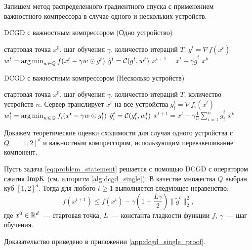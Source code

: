     Запишем метод распределенного градиентного спуска с применением важностного компрессора в случае одного и нескольких устройств.
    \begin{algorithm}[h]
        \caption{DCGD с важностным компрессором (Одно устройство)}
        \label{alg:dcgd_single}
        \begin{algorithmic}
             стартовая точка $x^0$, шаг обучения $\gamma$, количество итераций $T$.
                \STATE $g^t = \nabla f(x^t)$
                \STATE $w^t = \operatorname*{arg\,min}_{w \in Q} f(x^t - \gamma w \odot g^t)$
                \STATE $\tilde{g}^t = {\cal C}(g^t, w^t)$
                \STATE $x^{t+1} = x^t - \gamma \tilde{g}^t$
            \ENDFOR
             $x^k$
        \end{algorithmic}
    \end{algorithm}

    \begin{algorithm}[h]
        \caption{DCGD с важностным компрессором (Несколько устройств)}
        \label{alg:dcgd_multi}
        \begin{algorithmic}[1]
             стартовая точка $x^0$, шаг обучения $\gamma$, количество итераций $T$, количество устройств $n$.
                \STATE Сервер транслирует $x^t$ на все устройства
                    \STATE $g_i^t = \nabla f_i(x^t)$
                    \STATE $w_i^t = \operatorname*{arg\,min}_{w \in Q} f_i(x^t - \gamma w \odot g_i^t)$
                    \STATE $\tilde{g}_i^t = {\cal C}(g_i^t, w_i^t)$
                \ENDFOR
                \STATE $x^{t+1} = x^t - \gamma \frac{1}{n} \sum\limits_{i=1}^n \tilde{g}_i^t$
            \ENDFOR
             $x^k$
        \end{algorithmic}
    \end{algorithm}

    Докажем теоретические оценки сходимости для случая одного устройства с $Q = [1, 2]^d$ и важностным компрессором, использующим перевзвешивание компонент.

    \begin{theorem}\label{th:dcgd_single}
        Пусть задача \eqref{eq:problem_statement} решается с помощью DCGD с оператором сжатия $\operatorname{ImpK}$ (см. алгоритм \ref{alg:dcgd_single}). В качестве множества $Q$ выбран куб $[1, 2]^d$. Тогда для любого $t \geq 1$ выполняется следующее неравенство:
        \begin{equation}
            f(x^{t + 1}) \leq f(x^t) - \gamma \left(1 - \frac{L \gamma}{2}\right) \|\tilde{g}^t\|_2^2,
        \end{equation}
        где $x^0 \in \mathbb{R}^d$~--- стартовая точка, $L$~--- константа гладкости функции $f$, $\gamma$~--- шаг обучения.
    \end{theorem}
    Доказательство приведено в приложении \ref{app:dcgd_single_proof}.

